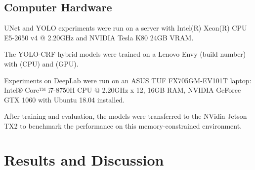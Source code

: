 \documentclass[journal]{IEEEtran}
\begin{document}
\subsection{Computer Hardware}
UNet and YOLO experiments were run on a server with Intel(R) Xeon(R) CPU E5-2650 v4 @ 2.20GHz and NVIDIA Tesla K80 24GB VRAM.

The YOLO-CRF hybrid models were trained on a Lenovo Envy (build number) with (CPU) and (GPU).

Experiments on DeepLab were run on an ASUS TUF FX705GM-EV101T laptop: Intel® Core™ i7-8750H CPU @ 2.20GHz x 12, 16GB RAM, NVIDIA GeForce GTX 1060 with Ubuntu 18.04 installed.

After training and evaluation, the models were transferred to the NVidia Jetson TX2 to benchmark the performance on this memory-constrained environment.
\section{Results and Discussion}
\end{document}
